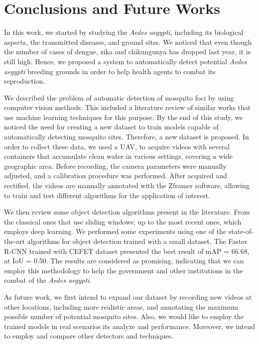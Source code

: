\chapter{Conclusions and Future Works}
\label{chap:conclusions}

%
In this work, we started by studying the {\it Aedes aegypti}, including its biological aspects, the transmitted diseases, and ground sites.
We noticed that even though the number of cases of dengue, zika and chikungunya has dropped last year, it is still high.
Hence, we proposed a system to automatically detect potential \textit{Aedes aegypti} breeding grounds in order to help health agents to combat its reproduction.

We described the problem of automatic detection of mosquito foci by using computer vision methods.
This included a literature review of similar works that use machine learning techniques for this purpose.
By the end of this study, we noticed the need for creating a new dataset to train models capable of automatically detecting mosquito sites.
Therefore, a new dataset is proposed.
In order to collect these data, we used a UAV, to acquire videos with several containers that accumulate clean water in various settings, covering a wide geographic area.
Before recording, the camera parameters were manually adjusted, and a calibration procedure was performed.
After acquired and rectified, the videos are manually annotated with the Zframer software, allowing to train and test different algorithms for the application of interest.

We then review some object detection algorithms present in the literature.
From the classical ones that use sliding windows; up to the most recent ones, which employs deep learning.
We performed some experiments using one of the state-of-the-art algorithms for object detection trained with a small dataset.
The Faster R-CNN trained with CEFET dataset presented the best result of mAP = 66.68, at IoU = 0.50.
The results are considered as promising, indicating that we can employ this methodology to help the government and other institutions in the combat of the {\textit{Aedes aegypti}}.


%
As future work, we first intend to expand our dataset by recording new videos at other locations, including more realistic areas, and annotating the maximum possible number of potential mosquito sites.
Also, we would like to employ the trained models in real scenarios its analyze and performance.
Moreover, we intend to employ and compare other detectors and techniques.


